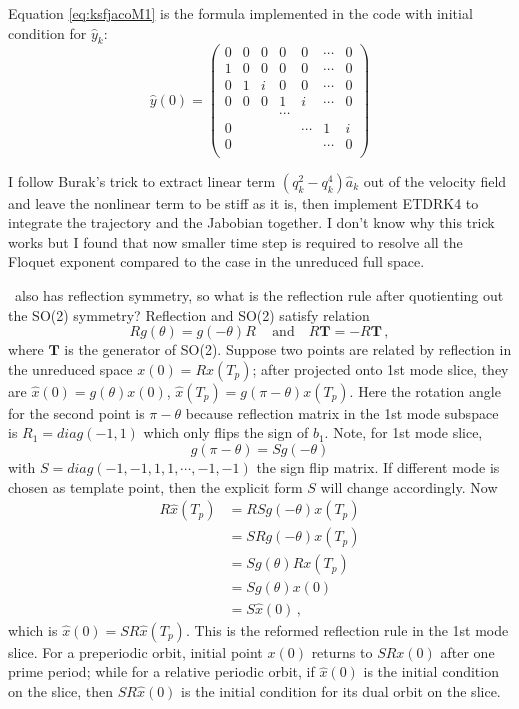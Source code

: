 Equation \eqref{eq:ksfjacoM1} is the formula implemented in the code with
initial condition for $\hat{y}_k$:
\[
  \hat{y}(0) =
  \begin{pmatrix}
    0 & 0 & 0 & 0 & 0 & \cdots & 0 \\
    1 & 0 & 0 & 0 & 0 & \cdots & 0 \\
    0 & 1 & i & 0 & 0 & \cdots & 0 \\
    0 & 0 & 0 & 1 & i & \cdots & 0 \\
    &&& \cdots & & & \\
    0 &   &   &   & \cdots & 1 & i \\
    0 &   &   &   &   & \cdots & 0 \\
  \end{pmatrix}
\]

I follow Burak's trick to extract linear term
$( q_k^2 - q_k^4 )\hat{a}_k$ out of the velocity field and
leave the nonlinear term to be stiff as it is, then implement ETDRK4 to
integrate the trajectory and the Jabobian together. I don't know why
this trick works but I found that now smaller time step is required
to resolve all the Floquet exponent compared to the case in the unreduced
full space.

\KSe\ also has reflection symmetry, so what is the reflection rule after
quotienting out the SO(2) symmetry? Reflection and SO(2) satisfy relation
\[
Rg(\theta) = g(-\theta)R \,\quad \text{and}\quad R\mathbf{T}=-R\mathbf{T}
\,,
\]
where $\mathbf{T}$ is the generator of SO(2). Suppose two points are related by reflection
in the unreduced space $x(0)=Rx(T_p)$; after projected onto 1st mode slice, they are
$\hat{x}(0)=g(\theta)x(0)$, $\hat{x}(T_p)=g(\pi-\theta)x(T_p)$. Here the rotation angle
for the second point is $\pi-\theta$ because reflection matrix in the 1st mode subspace is
$R_1=diag(-1,1)$ which only flips the sign of $b_1$. Note, for 1st mode slice,
\[
g(\pi-\theta) = Sg(-\theta)
\]
with $S=diag(-1,-1,1,1,\cdots,-1,-1)$ the sign flip matrix. If different mode is chosen as
template point, then the explicit form $S$ will change accordingly. Now
\begin{align*}
  R\hat{x}(T_p) & = RSg(-\theta)x(T_p) \\
  & = S Rg(-\theta)x(T_p)  \\
  & = Sg(\theta)Rx(T_p) \\
  & = Sg(\theta)x(0) \\
  & = S\hat{x}(0)
  \,,
\end{align*}
which is $\hat{x}(0)=SR\hat{x}(T_p)$. This is the reformed reflection rule in the 1st mode
slice. For a preperiodic orbit, initial point $x(0)$ returns to $SRx(0)$ after one prime period;
while for a relative periodic orbit, if $\hat{x}(0)$ is the initial condition on the slice, then
$SR\hat{x}(0)$ is the initial condition for its dual orbit on the slice.


